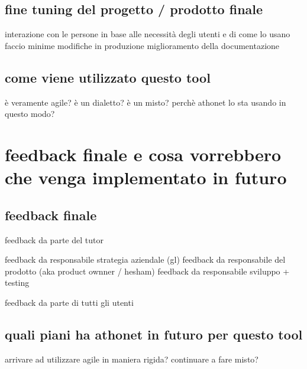 	\subsection{fine tuning del progetto / prodotto finale}
		interazione con le persone
		in base alle necessità degli utenti e di come lo usano faccio minime modifiche in produzione
		miglioramento della documentazione
	
	\subsection{come viene utilizzato questo tool}
		è veramente agile? 
		è un dialetto?
		è un misto?
		perchè athonet lo sta usando in questo modo?

\section{feedback finale e cosa vorrebbero che venga implementato in futuro}

	\subsection{feedback finale}
		feedback da parte del tutor
		
		feedback da responsabile strategia aziendale (gl)
		feedback da responsabile del prodotto (aka product ownner / hesham)
		feedback da responsabile sviluppo + testing
			
		feedback da parte di tutti gli utenti
	
	\subsection{quali piani ha athonet in futuro per questo tool}
		arrivare ad utilizzare agile in maniera rigida?
		continuare a fare misto?
